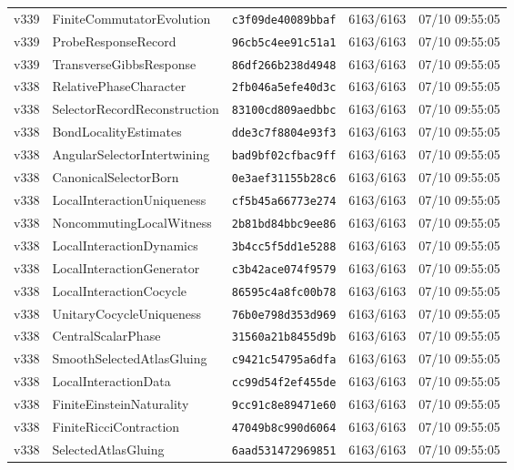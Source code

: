\documentclass[11pt]{article}
\theoremstyle{definition}\newtheorem{deriv}{Derivação}
\begin{document}
{\begin{longtable}{@{}lllll@{}}
v339 & FiniteCommutatorEvolution & \texttt{c3f09de40089bbaf} & 6163/6163 & 07/10 09:55:05 \\
v339 & ProbeResponseRecord & \texttt{96cb5c4ee91c51a1} & 6163/6163 & 07/10 09:55:05 \\
v339 & TransverseGibbsResponse & \texttt{86df266b238d4948} & 6163/6163 & 07/10 09:55:05 \\
v338 & RelativePhaseCharacter & \texttt{2fb046a5efe40d3c} & 6163/6163 & 07/10 09:55:05 \\
v338 & SelectorRecordReconstruction & \texttt{83100cd809aedbbc} & 6163/6163 & 07/10 09:55:05 \\
v338 & BondLocalityEstimates & \texttt{dde3c7f8804e93f3} & 6163/6163 & 07/10 09:55:05 \\
v338 & AngularSelectorIntertwining & \texttt{bad9bf02cfbac9ff} & 6163/6163 & 07/10 09:55:05 \\
v338 & CanonicalSelectorBorn & \texttt{0e3aef31155b28c6} & 6163/6163 & 07/10 09:55:05 \\
v338 & LocalInteractionUniqueness & \texttt{cf5b45a66773e274} & 6163/6163 & 07/10 09:55:05 \\
v338 & NoncommutingLocalWitness & \texttt{2b81bd84bbc9ee86} & 6163/6163 & 07/10 09:55:05 \\
v338 & LocalInteractionDynamics & \texttt{3b4cc5f5dd1e5288} & 6163/6163 & 07/10 09:55:05 \\
v338 & LocalInteractionGenerator & \texttt{c3b42ace074f9579} & 6163/6163 & 07/10 09:55:05 \\
v338 & LocalInteractionCocycle & \texttt{86595c4a8fc00b78} & 6163/6163 & 07/10 09:55:05 \\
v338 & UnitaryCocycleUniqueness & \texttt{76b0e798d353d969} & 6163/6163 & 07/10 09:55:05 \\
v338 & CentralScalarPhase & \texttt{31560a21b8455d9b} & 6163/6163 & 07/10 09:55:05 \\
v338 & SmoothSelectedAtlasGluing & \texttt{c9421c54795a6dfa} & 6163/6163 & 07/10 09:55:05 \\
v338 & LocalInteractionData & \texttt{cc99d54f2ef455de} & 6163/6163 & 07/10 09:55:05 \\
v338 & FiniteEinsteinNaturality & \texttt{9cc91c8e89471e60} & 6163/6163 & 07/10 09:55:05 \\
v338 & FiniteRicciContraction & \texttt{47049b8c990d6064} & 6163/6163 & 07/10 09:55:05 \\
v338 & SelectedAtlasGluing & \texttt{6aad531472969851} & 6163/6163 & 07/10 09:55:05 \\

\end{longtable}}
\end{document}

